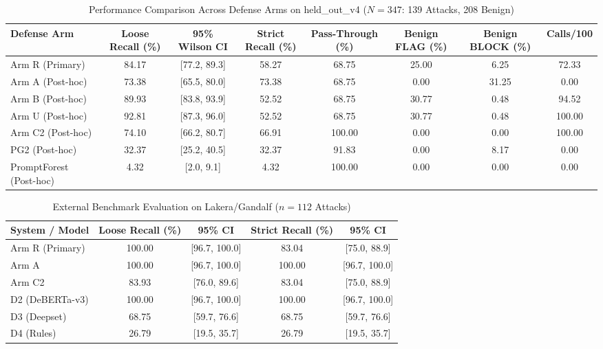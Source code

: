 \begin{table}[t]
\centering
\caption{Performance Comparison Across Defense Arms on held\_out\_v4 ($N=347$: 139 Attacks, 208 Benign)}
\label{tab:held_out_arms}
\begin{tabular}{lccccccc}
\toprule
\textbf{Defense Arm} & \textbf{Loose Recall (\%)} & \textbf{95\% Wilson CI} & \textbf{Strict Recall (\%)} & \textbf{Pass-Through (\%)} & \textbf{Benign FLAG (\%)} & \textbf{Benign BLOCK (\%)} & \textbf{Calls/100} \\
\midrule
Arm R (Primary) & 84.17 & [77.2, 89.3] & 58.27 & 68.75 & 25.00 & 6.25 & 72.33 \\
Arm A (Post-hoc) & 73.38 & [65.5, 80.0] & 73.38 & 68.75 & 0.00 & 31.25 & 0.00 \\
Arm B (Post-hoc) & 89.93 & [83.8, 93.9] & 52.52 & 68.75 & 30.77 & 0.48 & 94.52 \\
Arm U (Post-hoc) & 92.81 & [87.3, 96.0] & 52.52 & 68.75 & 30.77 & 0.48 & 100.00 \\
Arm C2 (Post-hoc) & 74.10 & [66.2, 80.7] & 66.91 & 100.00 & 0.00 & 0.00 & 100.00 \\
PG2 (Post-hoc) & 32.37 & [25.2, 40.5] & 32.37 & 91.83 & 0.00 & 8.17 & 0.00 \\
PromptForest (Post-hoc) & 4.32 & [2.0, 9.1] & 4.32 & 100.00 & 0.00 & 0.00 & 0.00 \\
\bottomrule
\end{tabular}
\end{table}

\begin{table}[t]
\centering
\caption{External Benchmark Evaluation on Lakera/Gandalf ($n=112$ Attacks)}
\label{tab:gandalf}
\begin{tabular}{lcccc}
\toprule
\textbf{System / Model} & \textbf{Loose Recall (\%)} & \textbf{95\% CI} & \textbf{Strict Recall (\%)} & \textbf{95\% CI} \\
\midrule
Arm R (Primary) & 100.00 & [96.7, 100.0] & 83.04 & [75.0, 88.9] \\
Arm A & 100.00 & [96.7, 100.0] & 100.00 & [96.7, 100.0] \\
Arm C2 & 83.93 & [76.0, 89.6] & 83.04 & [75.0, 88.9] \\
D2 (DeBERTa-v3) & 100.00 & [96.7, 100.0] & 100.00 & [96.7, 100.0] \\
D3 (Deepset) & 68.75 & [59.7, 76.6] & 68.75 & [59.7, 76.6] \\
D4 (Rules) & 26.79 & [19.5, 35.7] & 26.79 & [19.5, 35.7] \\
\bottomrule
\end{tabular}
\end{table}

